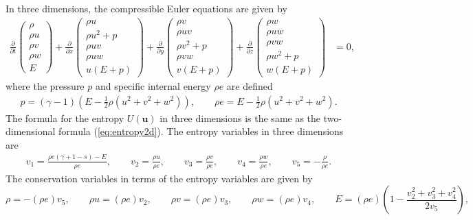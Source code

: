 \documentclass[preprint,10pt]{article}
\theoremstyle{definition}
\theoremstyle{lemma}
\theoremstyle{theorem}
\theoremstyle{assumption}
\newcommand{\pd}[2]{\frac{\partial#1}{\partial#2}}
\newcommand{\LRp}[1]{\left( #1 \right)}
\begin{document}
{In three dimensions, the compressible Euler equations are given by
\begin{align}
\pd{}{t}\LRp{\begin{array}{c}
\rho\\
\rho u\\
\rho v\\
\rho w\\
E
\end{array}} +
\pd{}{x}\LRp{\begin{array}{c}
\rho u\\
\rho u^2+p\\
\rho uv\\
\rho uw\\
u(E+p)
\end{array}} + \pd{}{y}\LRp{\begin{array}{c}
\rho v\\
\rho uv\\
\rho v^2+p\\
\rho vw\\
v(E+p)
\end{array}}  + \pd{}{z}\LRp{\begin{array}{c}
\rho w\\
\rho uw\\
\rho vw\\
\rho w^2+p\\
w(E+p)
\end{array}} &= 0,
\label{eq:euler3d}
\end{align}
where the pressure $p$ and specific internal energy $\rho e$ are defined 
\begin{align}
p = (\gamma-1)\LRp{E - \frac{1}{2}\rho (u^2+v^2+w^2)}, \qquad \rho e = E - \frac{1}{2}\rho (u^2+v^2+w^2).  
\label{eq:pressure3d}
\end{align}
The formula for the entropy $U(\bm{u})$ in three dimensions is the same as the two-dimensional formula (\ref{eq:entropy2d}).  
 The entropy variables in three dimensions are 
\begin{align}
v_1 = \frac{\rho e (\gamma + 1 - s) - E}{\rho e}, \qquad v_2 = \frac{\rho u}{\rho e}, \qquad v_3 = \frac{\rho v}{\rho e}, \qquad v_4 = \frac{\rho w}{\rho e}, \qquad v_5 = -\frac{\rho}{\rho e}.
\end{align}
The conservation variables in terms of the entropy variables are given by
\begin{equation}
\rho = -(\rho e) v_5, \qquad \rho u = (\rho e) v_2, \qquad \rho v = (\rho e) v_3, \qquad \rho w = (\rho e) v_4, \qquad E = (\rho e)\LRp{1 - \frac{{v_2^2+v_3^2+v_4^2}}{2 v_5}},

\end{equation}}
\end{document}
